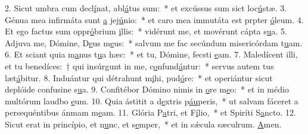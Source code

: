 2. Sicut umbra cum decl\uline{í}nat, abl\uline{á}tus sum:~* et excússus sum sict loc\uline{ú}stæ.
3. Génua mea infirmáta sunt \uline{a} jej\uline{ú}nio:~* et caro mea immutáta est prpter \uline{ó}leum.
4. Et ego factus sum oppr\uline{ó}brium \uline{i}llis:~* vidérunt me, et movérunt cápta s\uline{u}a.
5. Adjuva me, Dómine, D\uline{e}us m\uline{e}us:~* salvum me fac secúndum misericórdam t\uline{u}am.
6. Et sciant quia m\uline{a}nus t\uline{u}a hæc:~* et tu, Dómine, fecsti \uline{e}am.
7. Maledícent illi, et tu benedíces:~† qui insúrgunt in me, c\uline{o}nfund\uline{á}ntur:~* servus autem tus læt\uline{á}bitur.
8. Induántur qui détrahunt m\uline{i}hi, pud\uline{ó}re:~* et operiántur sicut deplóide confusine s\uline{u}a.
9. Confitébor Dómino nimis in \uline{o}re m\uline{e}o:~* et in médio multórum laudbo \uline{e}um.
10. Quia ástitit a d\uline{e}xtris p\uline{áu}peris,~* ut salvam fáceret a persequéntibus ánmam m\uline{e}am.
11. Glória P\uline{a}tri, et F\uline{í}lio,~* et Spiríti S\uline{a}ncto.
12. Sicut erat in princípio, et n\uline{u}nc, et s\uline{e}mper,~* et in sǽcula sæculrum. \uline{A}men.
